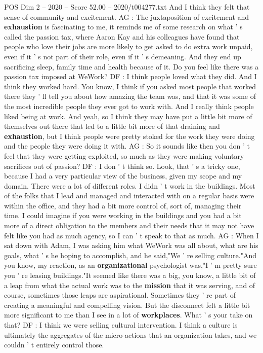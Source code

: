 \begin{textsample}{POS Dim 2 – 2020 – Score 52.00 – 2020/t004277.txt}
And I think they felt that sense of community and excitement.
AG : The juxtaposition of excitement and \textbf{exhaustion} is fascinating to me, it reminds me of some research on what ' s called the passion tax, where Aaron Kay and his colleagues have found that people who love their jobs are more likely to get asked to do extra work unpaid, even if it ' s not part of their role, even if it ' s demeaning.
And they end up sacrificing sleep, family time and health because of it.
Do you feel like there was a passion tax imposed at WeWork?
DF : I think people loved what they did.
And I think they worked hard.
You know, I think if you asked most people that worked there they ' ll tell you about how amazing the team was, and that it was some of the most incredible people they ever got to work with.
And I really think people liked being at work.
And yeah, so I think they may have put a little bit more of themselves out there that led to a little bit more of that draining and \textbf{exhaustion}, but I think people were pretty stoked for the work they were doing and the people they were doing it with.
AG : So it sounds like then you don ' t feel that they were getting exploited, so much as they were making voluntary sacrifices out of passion?
DF : I don ' t think so.
Look, that ' s a tricky one, because I had a very particular view of the business, given my scope and my domain.
There were a lot of different roles.
I didn ' t work in the buildings.
Most of the folks that I lead and managed and interacted with on a regular basis were within the office, and they had a bit more control of, sort of, managing their time.
I could imagine if you were working in the buildings and you had a bit more of a direct obligation to the members and their needs that it may not have felt like you had as much agency, so I can ' t speak to that as much.
AG : When I sat down with Adam, I was asking him what WeWork was all about, what are his goals, what ' s he hoping to accomplish, and he said,"We ' re selling culture."And you know, my reaction, as an \textbf{organizational} psychologist was,"I ' m pretty sure you ' re leasing buildings."It seemed like there was a big, you know, a little bit of a leap from what the actual work was to the \textbf{mission} that it was serving, and of course, sometimes those leaps are aspirational.
Sometimes they ' re part of creating a meaningful and compelling vision.
But the disconnect felt a little bit more significant to me than I see in a lot of \textbf{workplaces}.
What ' s your take on that?
DF : I think we were selling cultural intervention.
I think a culture is ultimately the aggregates of the micro-actions that an organization takes, and we couldn ' t entirely control those.

\end{textsample}
